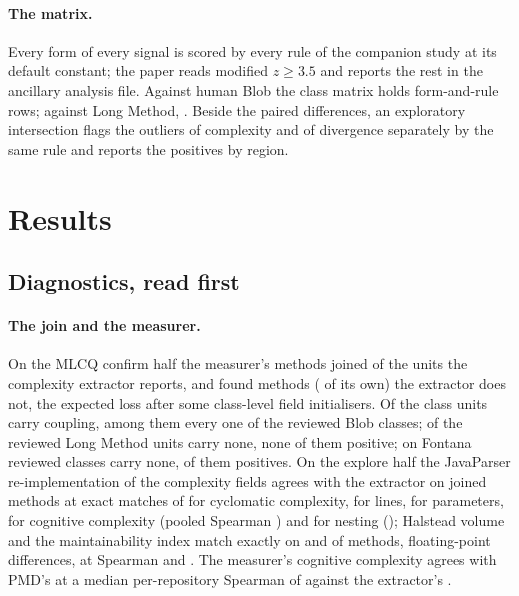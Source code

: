 \documentclass[11pt,a4paper]{article}
\newcommand{\madz}{modified $z \geq 3.5$}
\begin{document}
\paragraph{The matrix.} Every form of every signal is scored by every rule
of the companion study at its default constant; the paper reads \madz{} and
reports the rest in the ancillary analysis file. Against human Blob the
class matrix holds \matrixBlobRows{} form-and-rule rows; against Long
Method, \matrixLongRows{}. Beside the paired differences, an exploratory
intersection flags the outliers of complexity and of divergence separately
by the same rule and reports the positives by region.

\section{Results}

\subsection{Diagnostics, read first}
\label{sec:diag}

\paragraph{The join and the measurer.} On the MLCQ confirm half the
measurer's methods joined \joinMlcqShare{} of the \joinMlcqLizardUnits{}
units the complexity extractor reports, and found \joinMlcqMeasurerExtra{}
methods (\joinMlcqMeasurerExtraShare{} of its own) the extractor does not,
the expected loss after some class-level field initialisers. Of the
\joinMlcqClassUnits{} class units \joinMlcqClassCoupledShare{} carry
coupling, among them every one of the \uncoupledBlobReviewed{} reviewed Blob
classes; \uncoupledLongUncoupled{} of the \uncoupledLongReviewed{} reviewed
Long Method units carry none, none of them positive; on Fontana
\uncoupledFontanaUncoupled{} reviewed classes carry none,
\uncoupledFontanaPositiveUncoupled{} of them positives.
On the explore half the JavaParser re-implementation of the complexity
fields agrees with the extractor on \agreeUnits{} joined methods at exact
matches of \agreeCcExact{} for cyclomatic complexity, \agreeNlocExact{} for
lines, \agreeParamsExact{} for parameters, \agreeCognitiveExact{} for
cognitive complexity (pooled Spearman \agreeCognitiveRho{}) and
\agreeNestingExact{} for nesting (\agreeNestingRho{}); Halstead volume and
the maintainability index match exactly on \agreeHvolExact{} and
\agreeMiExact{} of methods, floating-point differences, at Spearman
\agreeHvolRho{} and \agreeMiRho{}. The measurer's cognitive complexity
agrees with PMD's at a median per-repository Spearman of \pmdCogMeasurer{}
against the extractor's \pmdCogPaperOne{}.
\end{document}
